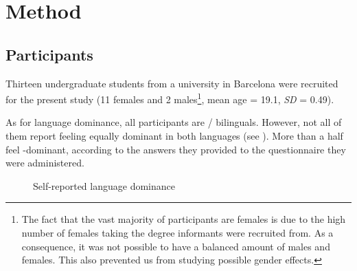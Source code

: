 \documentclass[output=paper]{langsci/langscibook}
\begin{document}
\section{Method}


\subsection{Participants} %



Thirteen undergraduate students from a university in Barcelona were recruited for the present study (11 females and 2 males\footnote{\textsuperscript{} The fact that the vast majority of participants are females is due to the high number of females taking the degree informants were recruited from. As a consequence, it was not possible to have a balanced amount of males and females. This also prevented us from studying possible gender effects.}, mean age = 19.1, \textit{SD} = 0.49).



As for language dominance, all participants are / bilinguals. However, not all of them report feeling equally dominant in both languages (see ). More than a half feel -dominant, according to the answers they provided to the questionnaire they were administered.




\begin{figure}

\caption{\label{fig:monje:1} Self-reported language dominance}
\end{figure}
  
\end{document}
